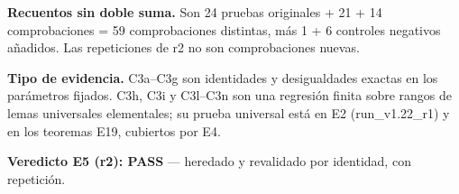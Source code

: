 \documentclass[
]{article}
\begin{document}
\textbf{Recuentos sin doble suma.} Son 24 pruebas originales + 21 + 14
comprobaciones = 59 comprobaciones distintas, más 1 + 6 controles
negativos añadidos. Las repeticiones de r2 no son comprobaciones nuevas.

\textbf{Tipo de evidencia.} C3a--C3g son identidades y desigualdades
exactas en los parámetros fijados. C3h, C3i y C3l--C3n son una regresión
finita sobre rangos de lemas universales elementales; su prueba
universal está en E2 (run\_v1.22\_r1) y en los teoremas E19, cubiertos
por E4.

\textbf{Veredicto E5 (r2): PASS} --- heredado y revalidado por
identidad, con repetición.
\end{document}
